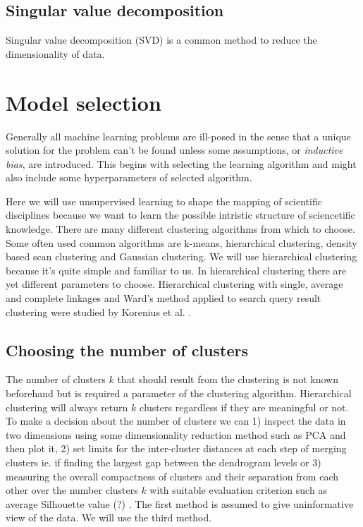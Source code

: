 \subsection{Singular value decomposition}
Singular value decomposition (SVD) is a common method to reduce 
the dimensionality of data. 


\section{Model selection}
Generally all machine learning problems are ill-posed in the sense 
that a unique solution for the problem can't be found unless some
assumptions, or \emph{inductive bias}, are introduced. This begins 
with selecting the learning algorithm and might also include some
hyperparameters of selected algorithm.

Here we will use unsupervised learning to shape the mapping of 
scientific disciplines because we want to learn the possible 
intristic structure of sciencetific knowledge.  
There are many different clustering algorithms from which to 
choose. Some often used common algorithms are k-means, hierarchical
clustering, density based scan clustering and Gaussian clustering.
We will use hierarchical clustering because it's quite simple and 
familiar to us.
In hierarchical clustering there are yet different parameters to 
choose. 
Hierarchical clustering with single, average and complete linkages
and Ward's method applied to search query result clustering were 
studied by Korenius et al. \cite{korenius_hierarchical_2006}.

\subsection{Choosing the number of clusters}
The number of clusters $k$ that should result from the clustering is
not known beforehand but is required a parameter of the
clustering algorithm. Hierarchical clustering will always return 
$k$ clusters regardless if they are meaningful or not. To make a
decision about the number of clusters we can 1) inspect the data in 
two dimensions using some dimensionality reduction method such as 
PCA and then plot it, 2) set limits for the inter-cluster 
distances at each step of merging clusters ie. if finding the 
largest gap between the dendrogram levels or 3) measuring the 
overall compactness of clusters and their separation from each 
other over the number clusters $k$ with suitable evaluation 
criterion such as average Silhouette value 
\cite{alpaydin2004introduction} \cite{calinski_dendrite_1974}(?) 
\cite{rousseeuw_silhouettes:_1987}. The first method is assumed to 
give uninformative view of the data. We will use the third method.





